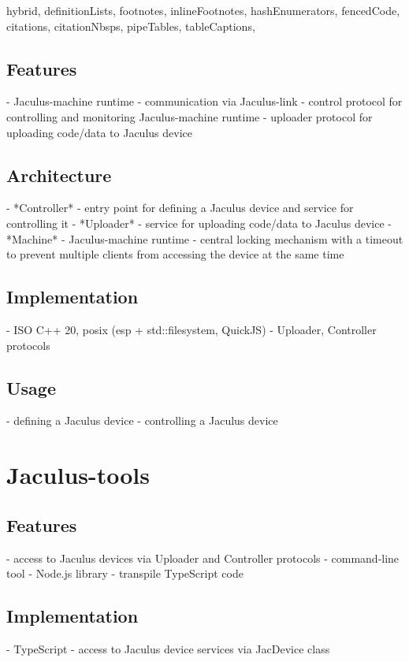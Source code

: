 \documentclass[
  digital,
  oneside,
  nosansbold,
  nocolorbold,
  lof,
  lot
]{fithesis4}
\begin{document}
\begin{markdown*}{%
  hybrid,
  definitionLists,
  footnotes,
  inlineFootnotes,
  hashEnumerators,
  fencedCode,
  citations,
  citationNbsps,
  pipeTables,
  tableCaptions,
}
\section{Features}

  - Jaculus-machine runtime
  - communication via Jaculus-link
  - control protocol for controlling and monitoring Jaculus-machine runtime
  - uploader protocol for uploading code/data to Jaculus device

\section{Architecture}

  - *Controller* - entry point for defining a Jaculus device and service for controlling it
  - *Uploader* - service for uploading code/data to Jaculus device
  - *Machine* - Jaculus-machine runtime
  - central locking mechanism with a timeout to prevent multiple clients from accessing the device at the same time

\section{Implementation}

  - ISO C++ 20, posix (esp + std::filesystem, QuickJS)
  - Uploader, Controller protocols

\section{Usage}

  - defining a Jaculus device
  - controlling a Jaculus device


\chapter{Jaculus-tools}

\section{Features}

  - access to Jaculus devices via Uploader and Controller protocols
  - command-line tool
  - Node.js library
  - transpile TypeScript code

\section{Implementation}

  - TypeScript
  - access to Jaculus device services via JacDevice class


\end{markdown*}
\end{document}
